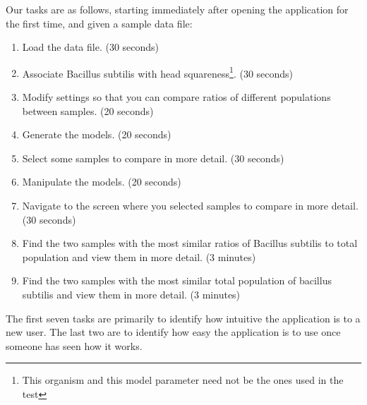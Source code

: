 \documentclass[letterpaper,10pt, onecolumn]{IEEEtran}
\begin{document}
Our tasks are as follows, starting immediately after opening the application for the first time, and given a sample data file:
\begin{enumerate}
	\item Load the data file. (30 seconds)
	\item Associate Bacillus subtilis with head squareness\footnote{This organism and this model parameter need not be the ones used in the test}. (30 seconds)
	\item Modify settings so that you can compare ratios of different populations between samples. (20 seconds)
	\item Generate the models. (20 seconds)
	\item Select some samples to compare in more detail. (30 seconds)
	\item Manipulate the models. (20 seconds)
	\item Navigate to the screen where you selected samples to compare in more detail. (30 seconds)
	\item Find the two samples with the most similar ratios of Bacillus subtilis to total population and view them in more detail. (3 minutes)
	\item Find the two samples with the most similar total population of bacillus subtilis and view them in more detail. (3 minutes)
\end{enumerate}

The first seven tasks are primarily to identify how intuitive the application is to a new user. The last two are to identify how easy the application is to use once someone has seen how it works.
\end{document}
